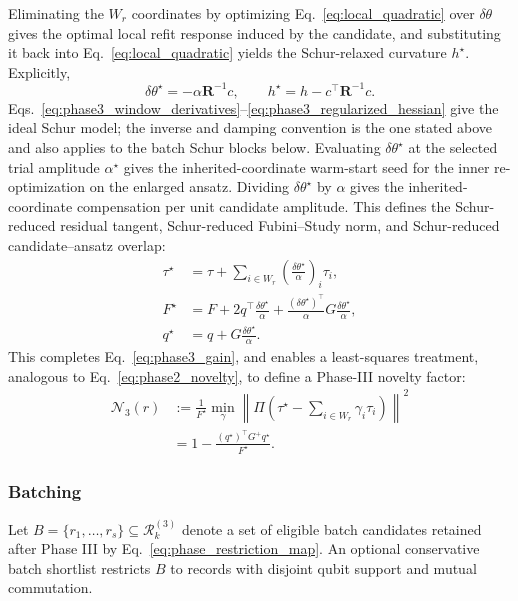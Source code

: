 \documentclass[
  reprint,
  amsmath,
  amssymb,
  aps,
  pra,
  nofootinbib,
  superscriptaddress,
  floatfix
]{revtex4-2}
\begin{document}
Eliminating the \(W_r\) coordinates by optimizing Eq.~\eqref{eq:local_quadratic} over $\delta\theta$ gives the optimal local refit response induced by the candidate, and substituting it back into Eq.~\eqref{eq:local_quadratic} yields the Schur-relaxed curvature $h^\star$. Explicitly,
\begin{equation}
\delta\theta^\star=-\alpha\mathbf R^{-1}c,
\qquad
h^\star=h-c^{\top}\mathbf R^{-1}c .
\label{eq:phase3_schur_response}
\end{equation}
Eqs.~\eqref{eq:phase3_window_derivatives}--\eqref{eq:phase3_regularized_hessian} give the ideal Schur model; the inverse and damping convention is the one stated above
and also applies to the batch Schur blocks below. Evaluating $\delta\theta^\star$ at the selected trial amplitude $\alpha^\star$ gives the inherited-coordinate warm-start seed for the inner re-optimization on the enlarged ansatz. Dividing $\delta\theta^\star$ by $\alpha$ gives the inherited-coordinate compensation per unit candidate amplitude. This defines the Schur-reduced residual tangent, Schur-reduced Fubini--Study norm, and Schur-reduced candidate--ansatz overlap:
\begin{equation}
\begin{aligned}
\tau^\star
&=\tau+\sum_{i\in W_r}\left(\frac{\delta\theta^\star}{\alpha}\right)_i\tau_i,\\
F^\star
&=F+2q^{\top}\frac{\delta\theta^\star}{\alpha}
+\frac{(\delta\theta^\star)^{\top}}{\alpha}G\frac{\delta\theta^\star}{\alpha},\\
q^\star
&=q+G\frac{\delta\theta^\star}{\alpha}.
\end{aligned}
\label{eq:phase3_star_geometry}
\end{equation}
This completes Eq.~\eqref{eq:phase3_gain}, and enables a least-squares treatment, analogous to Eq.~\eqref{eq:phase2_novelty}, to define a Phase-III novelty factor:
\begin{equation}
\begin{aligned}
\mathcal N_3(r)
&:=
\frac{1}{F^\star}
\min_{\gamma}
\left\|
\Pi\left(\tau^\star-\sum_{i\in W_r}\gamma_i\tau_i\right)
\right\|^2 \\
&=
1-\frac{(q^\star)^{\top}G^+q^\star}
{F^\star}.
\end{aligned}
\label{eq:phase3_novelty}
\end{equation}

\subsubsection{Batching}
Let \(B=\{r_1,\ldots,r_s\}\subseteq\mathcal R_k^{(3)}\) denote a set of eligible batch candidates retained after Phase III by Eq.~\eqref{eq:phase_restriction_map}. An optional conservative batch shortlist restricts \(B\) to records with disjoint qubit support and mutual commutation.
\end{document}
